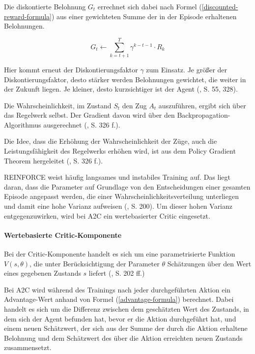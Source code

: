 Die diskontierte Belohnung $G_t$ errechnet sich dabei nach Formel (\ref{discounted-reward-formula}) aus einer gewichteten Summe der in der Episode erhaltenen Belohnungen.

\begin{equation}\label{discounted-reward-formula}
	G_t \leftarrow \sum_{k=t+1}^{T} \gamma ^{k-t-1} \cdot R_k
\end{equation}

Hier kommt erneut der Diskontierungsfaktor $\gamma$ zum Einsatz. Je größer der Diskontierungsfaktor, desto stärker werden Belohnungen gewichtet, die weiter in der Zukunft liegen. Je kleiner, desto \glqq kurzsichtiger\grqq{} ist der Agent (\cite{Sutton.2018}, S. 55, 328).

Die Wahrscheinlichkeit, im Zustand $S_t$ den Zug $A_t$ auszuführen, ergibt sich über das Regelwerk selbst. Der Gradient davon wird über den Backpropagation-Algorithmus ausgerechnet (\cite{Sutton.2018}, S. 326 f.).

Die Idee, dass die Erhöhung der Wahrscheinlichkeit der Züge, auch die Leistungsfähigkeit des Regelwerks erhöhen wird, ist aus dem Policy Gradient Theorem hergeleitet (\cite{Sutton.2018}, S. 326 f.).

REINFORCE weist häufig langsames und instabiles Training auf. Das liegt daran, dass die Parameter auf Grundlage von den Entscheidungen einer gesamten Episode angepasst werden, die einer Wahrscheinlichkeitsverteilung unterliegen und damit eine hohe Varianz aufweisen (\cite{Albrecht.2024}, S. 200). Um dieser hohen Varianz entgegenzuwirken, wird bei A2C ein wertebasierter Critic eingesetzt.

\paragraph{Wertebasierte Critic-Komponente}

Bei der Critic-Komponente handelt es sich um eine parametrisierte Funktion $V(s, \theta)$, die unter Berücksichtigung der Parameter $\theta$ Schätzungen über den Wert eines gegebenen Zustands $s$ liefert (\cite{Albrecht.2024}, S. 202 ff.)

Bei A2C wird während des Trainings nach jeder durchgeführten Aktion ein Advantage-Wert anhand von Formel (\ref{advantage-formula}) berechnet. Dabei handelt es sich um die Differenz zwischen dem geschätzten Wert des Zustands, in dem sich der Agent befunden hat, bevor er die Aktion durchgeführt hat, und einem neuen Schätzwert, der sich aus der Summe der durch die Aktion erhaltene Belohnung und dem Schätzwert des über die Aktion erreichten neuen Zustands zusammensetzt.

